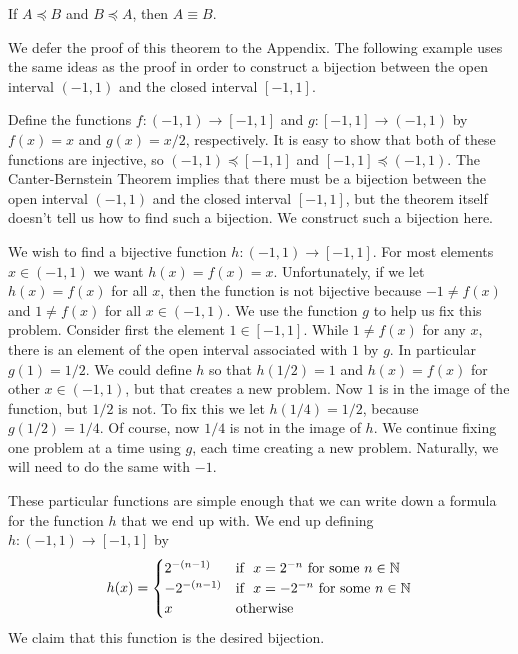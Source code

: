\begin{thrm}\label{thrm:CB}
If $A\preceq B$ and $B\preceq A$, then $A\equiv B$.
\end{thrm}

We defer the proof of this theorem to the Appendix.  The following example uses the same ideas as the proof in order to construct a bijection between the open interval $(-1,1)$ and the closed interval $[-1,1]$.

\begin{example}\label{ex:openclosed}
Define the functions $f:(-1,1)\to[-1,1]$ and $g:[-1,1]\to(-1,1)$ by $f(x)=x$ and $g(x)=x/2$, respectively.  It is easy to show that both of these functions are injective, so $(-1,1)\preceq[-1,1]$ and $[-1,1]\preceq(-1,1)$.  The Canter-Bernstein Theorem implies that there must be a bijection between the open interval $(-1,1)$ and the closed interval $[-1,1]$, but the theorem itself doesn't tell us how to find such a bijection.  We construct such a bijection here.

We wish to find a bijective function $h:(-1,1)\to[-1,1]$.  For most elements $x\in(-1,1)$ we want $h(x)=f(x)=x$.  Unfortunately, if we let $h(x)=f(x)$ for all $x$, then the function is not bijective because $-1\neq f(x)$ and $1\neq f(x)$ for all $x\in(-1,1)$.  We use the function $g$ to help us fix this problem.  Consider first the element $1\in[-1,1]$.  While $1\neq f(x)$ for any $x$, there is an element of the open interval associated with $1$ by $g$.  In particular $g(1)=1/2$. We could define $h$ so that $h(1/2)=1$ and $h(x)=f(x)$ for other $x\in(-1,1)$, but that creates a new problem.  Now $1$ is in the image of the function, but $1/2$ is not.  To fix this we let $h(1/4)=1/2$, because $g(1/2)=1/4$.  Of course, now $1/4$ is not in the image of $h$.
We continue fixing one problem at a time using $g$, each time creating a new problem.  Naturally, we will need to do the same with $-1$.

These particular functions are simple enough that we can write down a formula for the function $h$ that we end up with.  We end up defining $h:(-1,1)\to[-1,1]$ by \[h(x)=
\begin{cases}
2^{-(n-1)} & \hbox{if }\ x=2^{-n} \hbox{\ for some}\ n\in\mathbb N\\
-2^{-(n-1)} & \hbox{if }\ x=-2^{-n} \hbox{\ for some}\ n\in\mathbb N\\
x & \hbox{otherwise}\\
\end{cases}\]
We claim that this function is the desired bijection.


\end{example}
